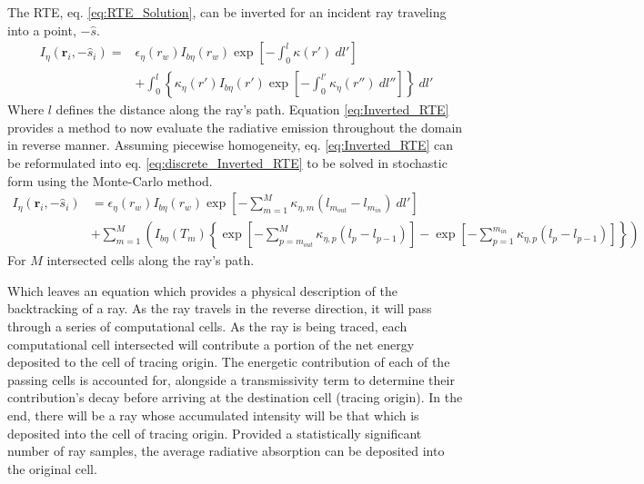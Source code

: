 The RTE, eq. \ref{eq:RTE_Solution}, can be inverted for an incident ray traveling into a point, $-\hat{s}$.
\begin{equation}
    \begin{aligned}
    I_\eta{}(\textbf{r}_i,-\hat{s}_i) = &\epsilon{}_\eta{}(r_w)I_{b\eta{}}(r_w)\exp{\left[-\int_0^l\kappa{}(r')~dl'\right]}\\
    &+\int_{0}^{l}{ \left\{ \kappa_\eta(r')I_{b\eta}(r')\exp{\left[-\int_0^{l'}\kappa_\eta(r'')~dl''\right]} \right\}}~dl'
    \label{eq:Inverted_RTE}
    \end{aligned}
\end{equation}
Where $l$ defines the distance along the ray's path. Equation \ref{eq:Inverted_RTE} provides a method to now evaluate the radiative emission throughout the domain in reverse manner.
Assuming piecewise homogeneity, eq. \ref{eq:Inverted_RTE} can be reformulated into eq. \ref{eq:discrete_Inverted_RTE} to be solved in stochastic form using the Monte-Carlo method.
\begin{equation}
    \begin{aligned}
    I_\eta{}(\textbf{r}_i,-\hat{s}_i)& = \epsilon{}_\eta{}(r_w)I_{b\eta{}}(r_w)\exp{\left[-\sum_{m=1}^M\kappa{}_{\eta{},m}(l_{m_{out}}-l_{m_{in}})~dl'\right]}\\
    &+\sum_{m=1}^M\left( I_{b\eta}(T_m)\left\{ \exp{\left[-\sum_{p=m_{out}}^M\kappa{}_{\eta{},p}(l_{p}-l_{p-1})\right]}- \exp{\left[-\sum_{p=1}^{m_{in}}\kappa{}_{\eta{},p}(l_{p}-l_{p-1})\right]} \right\} \right)
    \label{eq:discrete_Inverted_RTE}
    \end{aligned}
\end{equation}
For $M$ intersected cells along the ray's path.

Which leaves an equation which provides a physical description of the backtracking of a ray.
As the ray travels in the reverse direction, it will pass through a series of computational cells. 
As the ray is being traced, each computational cell intersected will contribute a portion of the net energy deposited to the cell of tracing origin. The energetic contribution of each of the passing cells is accounted for, alongside a transmissivity term to determine their contribution's decay before arriving at the destination cell (tracing origin).
In the end, there will be a ray whose accumulated intensity will be that which is deposited into the cell of tracing origin.
Provided a statistically significant number of ray samples, the average radiative absorption can be deposited into the original cell.


